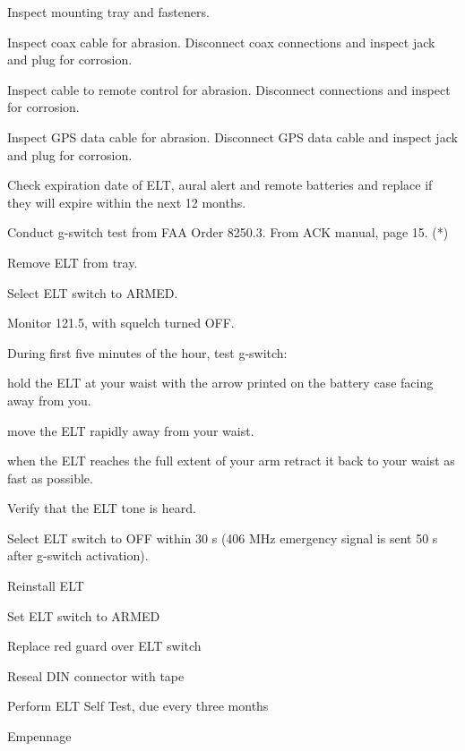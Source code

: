 \begin{enumerate*}
\begin{enumerate*}
  	\item Inspect mounting tray and fasteners. 
  	\item Inspect coax cable for abrasion. Disconnect coax connections and inspect jack and plug for corrosion. 
  	\item Inspect cable to remote control for abrasion. Disconnect connections and inspect for corrosion. 
  	\item Inspect GPS data cable for abrasion. Disconnect GPS data cable and inspect jack and plug for corrosion.
  	\item Check expiration date of ELT, aural alert and remote batteries and replace if they will expire within the next 12 months. 
  	\item Conduct g-switch test from FAA Order 8250.3. From ACK manual, page 15. (*)
  	\begin{enumerate*}
  		\item Remove ELT from tray. 
  		\item Select ELT switch to ARMED. 
  		\item Monitor 121.5, with squelch turned OFF. 
  		\item During first five minutes of the hour, test g-switch: 
  		\begin{enumerate*}
  		  \item hold the ELT at your waist with the arrow printed on the battery case facing away from you. 
  		  \item move the ELT rapidly away from your waist. 
  		  \item when the ELT reaches the full extent of your arm retract it back to your waist as fast as possible.
  		  \end{enumerate*} 
  		\item Verify that the ELT tone is heard. 
  		\item Select ELT switch to OFF within 30 s (406 MHz emergency signal is sent 50 s after g-switch activation). 
  	\end{enumerate*}
  	\item Reinstall ELT
  	\item Set ELT switch to ARMED
  	\item Replace red guard over ELT switch
  	\item Reseal DIN connector with tape
  	\item Perform ELT Self Test, due every three months
  \end{enumerate*}
	\item{Empennage} 
	\begin{enumerate*}

\end{enumerate*}
\end{enumerate*}
